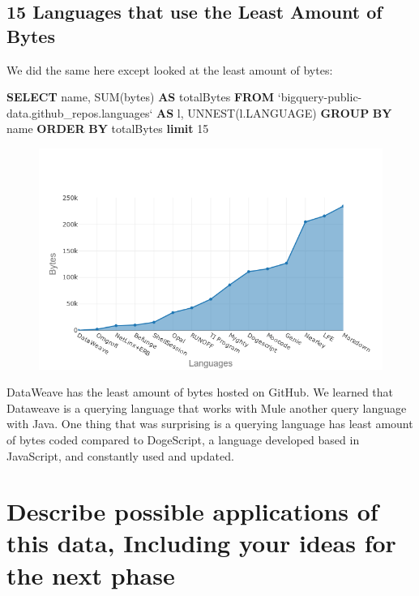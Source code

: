 \documentclass[11pt]{article}
\makeatletter
\def\maxwidth{\ifdim\Gin@nat@width>\linewidth\linewidth
    \else\Gin@nat@width\fi}
\let\Oldincludegraphics\includegraphics
\renewcommand{\includegraphics}[1]{\Oldincludegraphics[width=.8\maxwidth]{#1}}
\newenvironment{Shaded}{}{}
\newcommand{\KeywordTok}[1]{\textcolor[rgb]{0.00,0.44,0.13}{\textbf{{#1}}}}
\newcommand{\DecValTok}[1]{\textcolor[rgb]{0.25,0.63,0.44}{{#1}}}
\newcommand{\FunctionTok}[1]{\textcolor[rgb]{0.02,0.16,0.49}{{#1}}}
\newcommand{\NormalTok}[1]{{#1}}
\makeatother
\begin{document}
    \subsection{15 Languages that use the Least Amount of
Bytes}\label{languages-that-use-the-least-amount-of-bytes}

    We did the same here except looked at the least amount of bytes:

\begin{Shaded}
\begin{Highlighting}[]
\KeywordTok{SELECT}
\NormalTok{  name,}
  \FunctionTok{SUM}\NormalTok{(bytes) }\KeywordTok{AS}\NormalTok{ totalBytes}
\KeywordTok{FROM}
\NormalTok{  `bigquery-public-data.github_repos.languages` }\KeywordTok{AS}\NormalTok{ l,}
\NormalTok{  UNNEST(l.LANGUAGE)}
\KeywordTok{GROUP} \KeywordTok{BY}
\NormalTok{  name}
\KeywordTok{ORDER} \KeywordTok{BY}
\NormalTok{  totalBytes}
\KeywordTok{limit} \DecValTok{15}
\end{Highlighting}
\end{Shaded}

\begin{figure}[H]
\centering
\includegraphics{newplot.png}
\caption{}
\end{figure}

    DataWeave has the least amount of bytes hosted on GitHub. We learned
that Dataweave is a querying language that works with Mule another query
language with Java. One thing that was surprising is a querying language
has least amount of bytes coded compared to DogeScript, a language
developed based in JavaScript, and constantly used and updated.


    \section{Describe possible applications of this data, Including your
ideas for the next
phase}\label{describe-possible-applications-of-this-data-including-your-ideas-for-the-next-phase}
\end{document}
